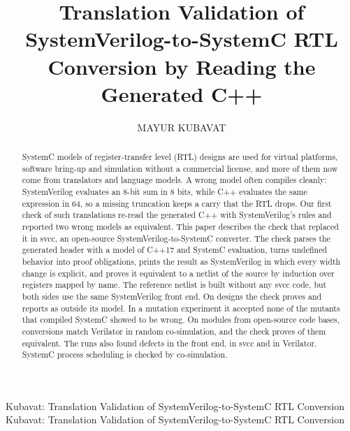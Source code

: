 \documentclass{ieeeaccess}
\begin{document}

\title{Translation Validation of SystemVerilog-to-SystemC RTL Conversion by Reading the Generated C++}

\author{\uppercase{Mayur Kubavat}}

\address[1]{Independent Researcher, Mountain View, CA 94040, USA}


\markboth
{Kubavat: Translation Validation of SystemVerilog-to-SystemC RTL Conversion}
{Kubavat: Translation Validation of SystemVerilog-to-SystemC RTL Conversion}


\begin{abstract}
SystemC models of register-transfer level (RTL) designs are used for virtual platforms, software
bring-up and simulation without a commercial license, and more of them now come from translators
and language models. A wrong model often compiles cleanly: SystemVerilog evaluates an 8-bit sum in
8 bits, while C++ evaluates the same expression in 64, so a missing truncation keeps a carry that
the RTL drops. Our first check of such translations re-read the generated C++ with SystemVerilog's
rules and reported two wrong models as equivalent. This paper describes the check that replaced it
in svcc, an open-source SystemVerilog-to-SystemC converter. The check parses the generated header
with a model of C++17 and SystemC evaluation, turns undefined behavior into proof obligations,
prints the result as SystemVerilog in which every width change is explicit, and proves it
equivalent to a netlist of the source by induction over registers mapped by name. The reference
netlist is built without any svcc code, but both sides use the same SystemVerilog front end. On
\nDesigns{} designs the check proves \nProved{} and reports \nNotCovered{} as outside its model. In
a mutation experiment it accepted none of the \nMutSimDiffers{} mutants that compiled SystemC showed
to be wrong. On \nModules{} modules from \nCodeBases{} open-source code bases, \nMatch{} conversions
match Verilator in random co-simulation, and the check proves \nCorpusProved{} of them equivalent. The runs also found defects in the front end, in svcc and in
Verilator. SystemC process scheduling is checked by co-simulation.
\end{abstract}
\end{document}

